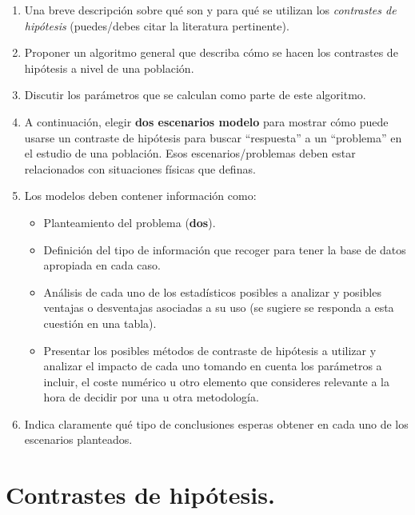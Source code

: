 \documentclass[a4paper,12pt]{article} %
\begin{document}
\begin{enumerate}
    \item Una breve descripción sobre qué son y para qué se utilizan los \textit{contrastes de hipótesis} (puedes/debes citar la literatura pertinente).

    \item Proponer un algoritmo general que describa cómo se hacen los contrastes de hipótesis a nivel de una población.

    \item Discutir los parámetros que se calculan como parte de este algoritmo.

    \item A continuación, elegir \textbf{dos escenarios modelo} para mostrar cómo puede usarse un contraste de hipótesis para buscar ``respuesta'' a un ``problema'' en el estudio de una población. Esos escenarios/problemas deben estar relacionados con situaciones físicas que definas.

    \item Los modelos deben contener información como:
    \begin{itemize}
        \item Planteamiento del problema (\textbf{dos}).
        \item Definición del tipo de información que recoger para tener la base de datos apropiada en cada caso.
        \item Análisis de cada uno de los estadísticos posibles a analizar y posibles ventajas o desventajas asociadas a su uso (se sugiere se responda a esta cuestión en una tabla).
        \item Presentar los posibles métodos de contraste de hipótesis a utilizar y analizar el impacto de cada uno tomando en cuenta los parámetros a incluir, el coste numérico u otro elemento que consideres relevante a la hora de decidir por una u otra metodología.
    \end{itemize}

    \item Indica claramente qué tipo de conclusiones esperas obtener en cada uno de los escenarios planteados.
\end{enumerate}

\vspace{\baselineskip}


\section{Contrastes de hipótesis.}
\end{document}

